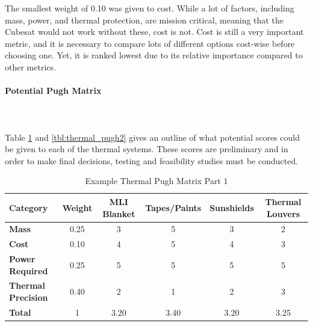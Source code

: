 The smallest weight of 0.10 was given to cost.  While a lot of factors, including mass, power, and thermal protection, are mission critical, meaning that the Cubesat would not work without these, cost is not.  Cost is still a very important metric, and it is necessary to compare lots of different options cost-wise before choosing one. Yet, it is ranked lowest due to its relative importance compared to other metrics.\\

\paragraph{Potential Pugh Matrix} ~\\~\\
Table \ref{tbl:thermal_pugh1} and \ref{tbl:thermal_pugh2} gives an outline of what potential scores could be given to each of the thermal systems. These scores are preliminary and in order to make final decisions, testing and feasibility studies must be conducted. 
\begin{table}[H]
\centering
\begin{tabular}{|l|c|c|c|c|c|} 
\hline
    \textbf{Category} & \textbf{Weight} & \textbf{MLI Blanket} & \textbf{Tapes/Paints} & \textbf{Sunshields} & \textbf{Thermal Louvers}
    \\
\hline
    \textbf{Mass} & 0.25 & 3 & 5 & 3 & 2 
    \\
\hline
    \textbf{Cost} & 0.10 & 4 & 5 & 4 & 3 
    \\
\hline
    \textbf{Power Required} & 0.25 & 5 & 5 & 5 & 5
    \\
\hline
    \textbf{Thermal Precision} & 0.40 & 2 & 1 & 2 & 3
    \\
\hline
    \textbf{Total} & 1 & 3.20 & 3.40 & 3.20 & 3.25
    \\
\hline
\end{tabular}
\caption{Example Thermal Pugh Matrix Part 1 }
\label{tbl:thermal_pugh1}
\end{table}

